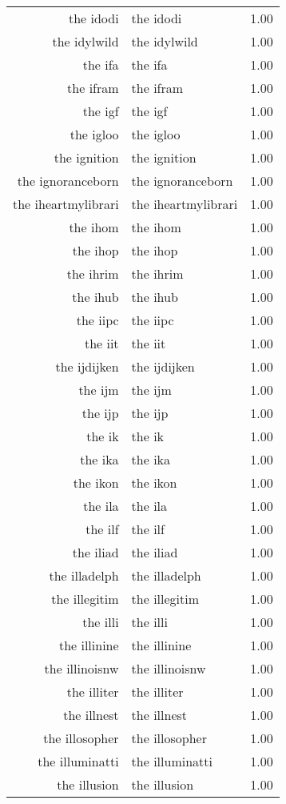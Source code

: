 \begin{table}[ht]
\begin{tabular}{rlr}
  the idodi & the idodi & 1.00 \\ 
  the idylwild & the idylwild & 1.00 \\ 
  the ifa & the ifa & 1.00 \\ 
  the ifram & the ifram & 1.00 \\ 
  the igf & the igf & 1.00 \\ 
  the igloo & the igloo & 1.00 \\ 
  the ignition & the ignition & 1.00 \\ 
  the ignoranceborn & the ignoranceborn & 1.00 \\ 
  the iheartmylibrari & the iheartmylibrari & 1.00 \\ 
  the ihom & the ihom & 1.00 \\ 
  the ihop & the ihop & 1.00 \\ 
  the ihrim & the ihrim & 1.00 \\ 
  the ihub & the ihub & 1.00 \\ 
  the iipc & the iipc & 1.00 \\ 
  the iit & the iit & 1.00 \\ 
  the ijdijken & the ijdijken & 1.00 \\ 
  the ijm & the ijm & 1.00 \\ 
  the ijp & the ijp & 1.00 \\ 
  the ik & the ik & 1.00 \\ 
  the ika & the ika & 1.00 \\ 
  the ikon & the ikon & 1.00 \\ 
  the ila & the ila & 1.00 \\ 
  the ilf & the ilf & 1.00 \\ 
  the iliad & the iliad & 1.00 \\ 
  the illadelph & the illadelph & 1.00 \\ 
  the illegitim & the illegitim & 1.00 \\ 
  the illi & the illi & 1.00 \\ 
  the illinine & the illinine & 1.00 \\ 
  the illinoisnw & the illinoisnw & 1.00 \\ 
  the illiter & the illiter & 1.00 \\ 
  the illnest & the illnest & 1.00 \\ 
  the illosopher & the illosopher & 1.00 \\ 
  the illuminatti & the illuminatti & 1.00 \\ 
  the illusion & the illusion & 1.00 \\ 

\end{tabular}
\end{table}
